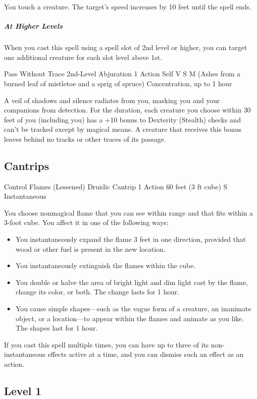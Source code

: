 \documentclass[letterpaper,openany,oneside,twocolumn]{book}
\begin{document}
You touch a creature. The target's speed increases by 10 feet until the spell ends.

\subparagraph*{At Higher Levels} When you cast this spell using a spell slot of 2nd level or higher, you can target one additional creature for each slot level above 1st.

\DndSpellHeader
  {Pass Without Trace}
  {2nd-Level Abjuration}
  {1 Action}
  {Self}
  {V S M (Ashes from a burned leaf of mistletoe and a sprig of spruce)}
  {Concentration, up to 1 hour}

A veil of shadows and silence radiates from you, masking you and your companions from detection. For the duration, each creature you choose within 30 feet of you (including you) has a +10 bonus to Dexterity (Stealth) checks and can't be tracked except by magical means. A creature that receives this bonus leaves behind no tracks or other traces of its passage.

\subsection*{Cantrips}

\DndSpellHeader
  {Control Flames (Lessened)}
  {Druidic Cantrip}
  {1 Action}
  {60 feet (3 ft cube)}
  {S}
  {Instantaneous}

You choose nonmagical flame that you can see within range and that fits within a 3-foot cube. You affect it in one of the following ways:
\begin{itemize}
	\item You instantaneously expand the flame 3 feet in one direction, provided that wood or other fuel is present in the new location.
	\item You instantaneously extinguish the flames within the cube.
	\item You double or halve the area of bright light and dim light cast by the flame, change its color, or both. The change lasts for 1 hour.
	\item You cause simple shapes—such as the vague form of a creature, an inanimate object, or a location—to appear within the flames and animate as you like. The shapes last for 1 hour.
\end{itemize}
If you cast this spell multiple times, you can have up to three of its non-instantaneous effects active at a time, and you can dismiss such an effect as an action.


\subsection*{Level 1}
\end{document}

